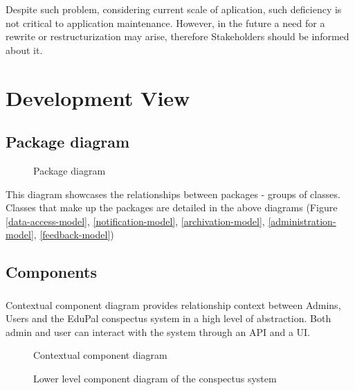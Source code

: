 \documentclass[
    english, %
]{VUMIFPSkursinis}
\begin{document}
Despite such problem, considering current scale of aplication, such deficiency is not critical to application maintenance. However, in the future a need for a rewrite or restructurization may arise, therefore Stakeholders should be informed about it.

\section{Development View}

\subsection{Package diagram}

\begin{figure}[ht]
    \centering
    
    \caption{Package diagram}
    \label{package-diagram}
\end{figure}

\begin{description}
    This diagram showcases the relationships between packages - groups of classes. Classes that make up the packages are detailed in the above diagrams (Figure \ref{data-access-model}, \ref{notification-model}, \ref{archivation-model}, \ref{administration-model}, \ref{feedback-model})
\end{description}

\subsection{Components}

\subsubsection*{} Contextual component diagram provides relationship context between Admins, Users and the EduPal conspectus system in a high level of abstraction. Both admin and user can interact with the system through an API and a UI.

\begin{figure}[ht]
    \centering
    
    \caption{Contextual component diagram}
    \label{component-level-1}
\end{figure}

\begin{figure}[ht]
    \centering
    
    \caption{Lower level component diagram of the conspectus system}
    \label{component-level-2}
\end{figure}
\end{document}
